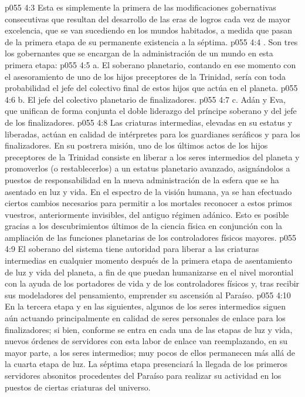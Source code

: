 \vs p055 4:3 Esta es simplemente la primera de las modificaciones gobernativas consecutivas que resultan del desarrollo de las eras de logros cada vez de mayor excelencia, que se van sucediendo en los mundos habitados, a medida que pasan de la primera etapa de su permanente existencia a la séptima.
\vs p055 4:4 . Son tres los gobernantes que se encargan de la administración de un mundo en esta primera etapa:
\vs p055 4:5 a. El soberano planetario, contando en ese momento con el asesoramiento de uno de los hijos preceptores de la Trinidad, sería con toda probabilidad el jefe del colectivo final de estos hijos que actúa en el planeta.
\vs p055 4:6 b. El jefe del colectivo planetario de finalizadores.
\vs p055 4:7 c. Adán y Eva, que unifican de forma conjunta el doble liderazgo del príncipe soberano y del jefe de los finalizadores.
\vs p055 4:8 \pc Las criaturas intermedias, elevadas en su estatus y liberadas, actúan en calidad de intérpretes para los guardianes seráficos y para los finalizadores. En su postrera misión, uno de los últimos actos de los hijos preceptores de la Trinidad consiste en liberar a los seres intermedios del planeta y promoverlos (o restablecerlos) a un estatus planetario avanzado, asignándolos a puestos de responsabilidad en la nueva administración de la esfera que se ha asentado en luz y vida. En el espectro de la visión humana, ya se han efectuado ciertos cambios necesarios para permitir a los mortales reconocer a estos primos vuestros, anteriormente invisibles, del antiguo régimen adánico. Esto es posible gracias a los descubrimientos últimos de la ciencia física en conjunción con la ampliación de las funciones planetarias de los controladores físicos mayores.
\vs p055 4:9 El soberano del sistema tiene autoridad para liberar a las criaturas intermedias en cualquier momento después de la primera etapa de asentamiento de luz y vida del planeta, a fin de que puedan humanizarse en el nivel morontial con la ayuda de los portadores de vida y de los controladores físicos y, tras recibir sus modeladores del pensamiento, emprender su ascensión al Paraíso.
\vs p055 4:10 En la tercera etapa y en las siguientes, algunos de los seres intermedios siguen aún actuando principalmente en calidad de seres personales de enlace para los finalizadores; si bien, conforme se entra en cada una de las etapas de luz y vida, nuevos órdenes de servidores con esta labor de enlace van reemplazando, en su mayor parte, a los seres intermedios; muy pocos de ellos permanecen más allá de la cuarta etapa de luz. La séptima etapa presenciará la llegada de los primeros servidores absonitos procedentes del Paraíso para realizar su actividad en los puestos de ciertas criaturas del universo.
